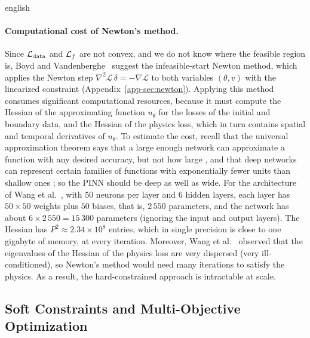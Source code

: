 \begin{hyphenrules}{english}
\paragraph{Computational cost of Newton's method.}
Since $\mathcal{L}_{\mathrm{data}}$ and $\mathcal{L}_f$ are not convex, and we do not know where the feasible region
is, Boyd and Vandenberghe~\cite{boyd2004} suggest the infeasible-start Newton method, which applies the Newton step
$\nabla^2\mathscr{L}\,\delta=-\nabla\mathscr{L}$ to both variables $(\theta,v)$ with the linearized
constraint (Appendix~\ref{app-sec:newton}).
Applying this method consumes significant computational resources, because it must compute the Hessian
of the approximating function $u_\theta$ for the losses of the initial and boundary data, and the
Hessian of the physics loss, which in turn contains spatial and temporal derivatives of $u_\theta$. To
estimate the cost, recall that the universal approximation theorem says that a large enough network
can approximate a function with any desired accuracy, but not how large \cite{lecun2015}, and that
deep networks can represent certain families of functions with exponentially fewer units than shallow
ones \cite{delalleau2011}; so the PINN should be deep as well as wide. For the architecture of
Wang et al.~\cite{wang2021gradient}, with $50$ neurons per layer and $6$ hidden layers, each layer has
$50\times50$ weights plus $50$ biases, that is, $2\,550$ parameters, and the network has about
$6\times2\,550=15\,300$ parameters (ignoring the input and output layers). The Hessian has
$P^2\approx2.34\times10^{8}$ entries, which in single precision is close to one gigabyte of memory, at
every iteration. Moreover, Wang et al.~\cite{wang2021gradient} observed that the eigenvalues of the Hessian of
the physics loss are very dispersed (very ill-conditioned), so Newton's method would need many
iterations to satisfy the physics. As a result, the hard-constrained approach is intractable at scale.

\subsection{Soft Constraints and Multi-Objective Optimization}


\end{hyphenrules}

